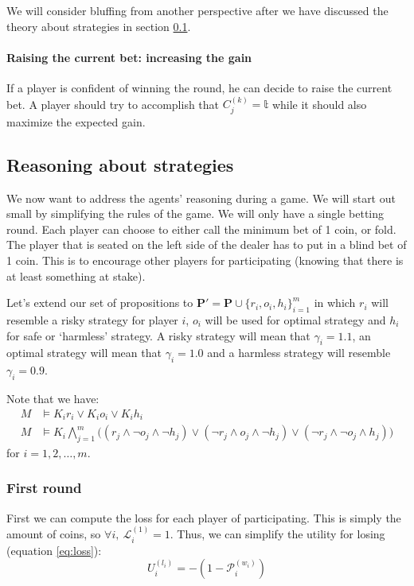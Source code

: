 \documentclass[a4paper,10pt]{article}
\begin{document}
We will consider bluffing from another perspective after we have discussed the theory about strategies in section \ref{sec:strat}.

\paragraph{Raising the current bet: increasing the gain}
If a player is confident of winning the round, he can decide to raise the current bet. A player should try to accomplish that $C^{(k)}_j = \mathbb{t}$ while it should also maximize the expected gain. 

\subsection{Reasoning about strategies}
\label{sec:strat}
We now want to address the agents' reasoning during a game. We will start out small by simplifying the rules of the game. We will only have a single betting round. Each player can choose to either call the minimum bet of 1 coin, or fold. The player that is seated on the left side of the dealer has to put in a blind bet of 1 coin. This is to encourage other players for participating (knowing that there is at least something at stake).

Let's extend our set of propositions to $\boldsymbol{P}'=\boldsymbol{P} \cup \{r_i,o_i,h_i\}_{i=1}^m$ in which $r_i$ will resemble a risky strategy for player $i$, $o_i$ will be used for optimal strategy and $h_i$ for safe or `harmless' strategy. A risky strategy will mean that $\gamma_i=1.1$, an optimal strategy will mean that $\gamma_i=1.0$ and a harmless strategy will resemble $\gamma_i=0.9$.

Note that we have:
\begin{align*}
 M &\models K_i r_i \vee K_i o_i \vee K_i h_i\\
 M &\models K_i \bigwedge_{j=1}^m\bigg( (r_j \wedge \neg o_j \wedge \neg h_j ) \vee
					(\neg r_j \wedge o_j \wedge \neg h_j) \vee
					(\neg r_j \wedge \neg o_j \wedge h_j)\bigg)
\end{align*}
for $i=1,2,\ldots,m$.

\subsubsection{First round}
First we can compute the loss for each player of participating. This is simply the amount of coins, so $\forall i,~\mathcal{L}^{(1)}_i=1$. Thus, we can simplify the utility for losing (equation \ref{eq:loss}):
\begin{equation}
U^{(l_i)}_i = -(1 - \mathcal{P}^{(w_i)}_i)
\label{eq:lossutil}
\end{equation}
\end{document}
